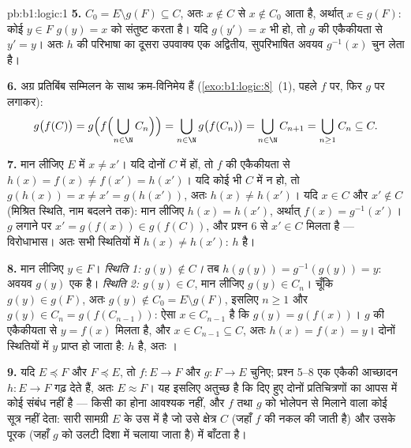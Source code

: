 \begin{solution}{pb:b1:logic:1}
\textbf{5.} $C_0 = E \setminus g(F) \subseteq C$, अतः $x \notin C$ से $x
\notin C_0$ आता है, अर्थात् $x \in g(F)$: कोई $y \in F$ $g(y) = x$ को
संतुष्ट करता है। यदि $g(y') = x$ भी हो, तो $g$ की एकैकीयता से $y' = y$। अतः
$h$ की परिभाषा का दूसरा उपवाक्य एक अद्वितीय, सुपरिभाषित अवयव $g^{-1}(x)$ चुन
लेता है।

\textbf{6.} अग्र प्रतिबिंब सम्मिलन के साथ क्रम-विनिमेय हैं
(\cref{exo:b1:logic:8}~(1), पहले $f$ पर, फिर $g$ पर लगाकर):
\[
g\bigl(f(C)\bigr)
= g\Bigl(f\Bigl(\bigcup_{n \in \N} C_n\Bigr)\Bigr)
= \bigcup_{n \in \N} g\bigl(f(C_n)\bigr)
= \bigcup_{n \in \N} C_{n+1}
= \bigcup_{n \geq 1} C_n \subseteq C .
\]

\textbf{7.} मान लीजिए $E$ में $x \neq x'$। यदि दोनों $C$ में हों, तो $f$ की
एकैकीयता से $h(x) = f(x) \neq f(x') = h(x')$। यदि कोई भी $C$ में न हो, तो
$g(h(x)) = x \neq x' = g(h(x'))$, अतः $h(x) \neq h(x')$। यदि $x \in C$ और
$x' \notin C$ (मिश्रित स्थिति, नाम बदलने तक): मान लीजिए $h(x) = h(x')$,
अर्थात् $f(x) = g^{-1}(x')$। $g$ लगाने पर $x' = g(f(x)) \in g(f(C))$, और
प्रश्न 6 से $x' \in C$ मिलता है --- विरोधाभास। अतः सभी स्थितियों में $h(x)
\neq h(x')$: $h$  है।

\textbf{8.} मान लीजिए $y \in F$। \emph{स्थिति 1: $g(y) \notin C$।} तब
$h(g(y)) = g^{-1}(g(y)) = y$: अवयव $g(y)$ एक  है। \emph{स्थिति
2: $g(y) \in C$}, मान लीजिए $g(y) \in C_n$। चूँकि $g(y) \in g(F)$, अतः $g(y)
\notin C_0 = E \setminus g(F)$, इसलिए $n \geq 1$ और $g(y) \in C_n =
g(f(C_{n-1}))$: ऐसा $x \in C_{n-1}$ है कि $g(y) = g(f(x))$। $g$ की एकैकीयता
से $y = f(x)$ मिलता है, और $x \in C_{n-1} \subseteq C$, अतः $h(x) = f(x) =
y$। दोनों स्थितियों में $y$ प्राप्त हो जाता है: $h$  है, अतः ।

\textbf{9.} यदि $E \preceq F$ और $F \preceq E$, तो   $f
\colon E \to F$ और $g \colon F \to E$ चुनिए; प्रश्न 5--8 एक एकैकी आच्छादन $h
\colon E \to F$ गढ़ देते हैं, अतः $E \approx F$। यह  इसलिए अतुच्छ है कि
दिए हुए दोनों  प्रतिचित्रणों का आपस में कोई संबंध नहीं है --- किसी का
 होना आवश्यक नहीं, और $f$ तथा $g$ को भोलेपन से मिलाने वाला कोई सूत्र
 नहीं देता: सारी सामग्री $E$ के उस  में है जो उसे क्षेत्र
$C$ (जहाँ $f$ की नकल की जाती है) और उसके पूरक (जहाँ $g$ को उलटी दिशा में
चलाया जाता है) में बाँटता है।


\end{solution}
